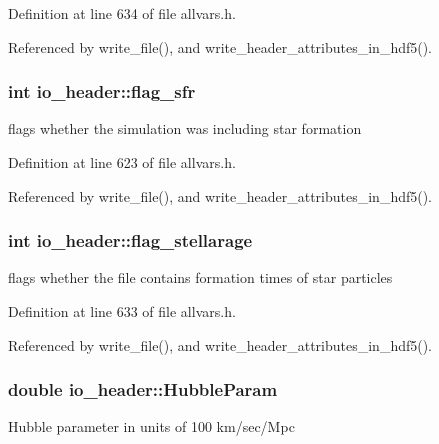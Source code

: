 Definition at line 634 of file allvars.h.



Referenced by write\_\-file(), and write\_\-header\_\-attributes\_\-in\_\-hdf5().

\hypertarget{structio__header_afe21a629578012fd99d118d2ad834763}{
\subsubsection[{flag\_\-sfr}]{\setlength{\rightskip}{0pt plus 5cm}int {\bf io\_\-header::flag\_\-sfr}}}
\label{structio__header_afe21a629578012fd99d118d2ad834763}
flags whether the simulation was including star formation 

Definition at line 623 of file allvars.h.



Referenced by write\_\-file(), and write\_\-header\_\-attributes\_\-in\_\-hdf5().

\hypertarget{structio__header_abe83e840bb4778a3be11a084dfa85c3c}{
\subsubsection[{flag\_\-stellarage}]{\setlength{\rightskip}{0pt plus 5cm}int {\bf io\_\-header::flag\_\-stellarage}}}
\label{structio__header_abe83e840bb4778a3be11a084dfa85c3c}
flags whether the file contains formation times of star particles 

Definition at line 633 of file allvars.h.



Referenced by write\_\-file(), and write\_\-header\_\-attributes\_\-in\_\-hdf5().

\hypertarget{structio__header_ad0f0d02804350f8935aadca9b5ef0fcf}{
\subsubsection[{HubbleParam}]{\setlength{\rightskip}{0pt plus 5cm}double {\bf io\_\-header::HubbleParam}}}
\label{structio__header_ad0f0d02804350f8935aadca9b5ef0fcf}
Hubble parameter in units of 100 km/sec/Mpc 


